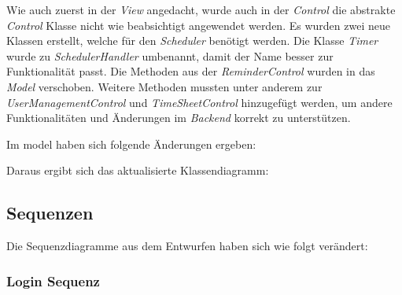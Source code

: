 Wie auch zuerst in der \emph{View} angedacht, wurde auch in der \emph{Control} die abstrakte \emph{Control} Klasse 
nicht wie beabsichtigt angewendet werden.
Es wurden zwei neue Klassen erstellt, welche für den \emph{Scheduler} benötigt werden. 
Die Klasse \emph{Timer} wurde zu \emph{SchedulerHandler} umbenannt, damit der Name besser zur Funktionalität passt.
Die Methoden aus der \emph{ReminderControl} wurden in das \emph{Model} verschoben.
Weitere Methoden mussten unter anderem zur \emph{UserManagementControl} und \emph{TimeSheetControl} hinzugefügt werden, 
um andere Funktionalitäten und Änderungen im \emph{Backend} korrekt zu unterstützen.

Im model haben sich folgende Änderungen ergeben: %



Daraus ergibt sich das aktualisierte Klassendiagramm:


\subsection{Sequenzen}
Die Sequenzdiagramme aus dem Entwurfen haben sich wie folgt verändert:
\subsubsection{Login Sequenz}

